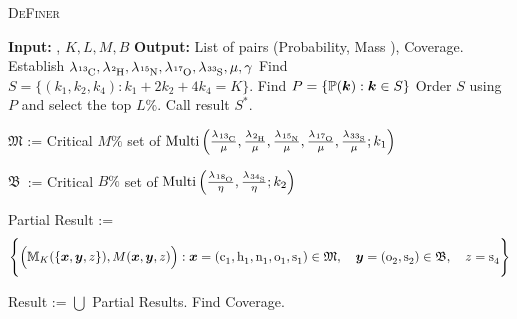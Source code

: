 \begin{algorithm}\caption{\textsc{DeFiner}}
\begin{algorithmic}\label{DeFine Parallely}
	\State	\textbf{Input:} \molecule, $K, L, M, B$
	\State 	\textbf{Output:} List of pairs (Probability, Mass ), Coverage.
	\State 	Establish $\lambda_\cem{^{13}C}, \lambda_\cem{^{2} H}, \lambda_\cem{^{15}N}, \lambda_\cem{^{17}O}, \lambda_\cem{^{33}S}, \mu, \gamma $
	\State 	Find  		$S = \{ (k_1, k_2, k_4) : k_1 + 2 k_2 + 4 k_4 = K \}$.
	\State 	Find 		$P = \{ \mathbb{P}(\bm{k}) : \bm{k} \in S \}$
	\State 	Order $S$ using $P$ and select the top $L \%$. Call result $S^*$.
	

		\State $\mathfrak{M}$ := Critical $M\%$ set of $\mathrm{Multi} \left(
				\frac{ \lambda_\cem{^{13}C} }{ \mu }, 
				\frac{ \lambda_\cem{^{2} H} }{ \mu }, 
				\frac{ \lambda_\cem{^{15}N} }{ \mu },
				\frac{ \lambda_\cem{^{17}O} }{ \mu }, 
				\frac{ \lambda_\cem{^{33}S} }{ \mu }; 
				k_1
			\right )$

		\State $\mathfrak{B}$ \,:= Critical $B\%$ set of 
		$\mathrm{Multi} \left(
			\frac{ \lambda_\cem{^{18}O} }{ \eta },
			\frac{ \lambda_\cem{^{34}S} }{ \eta }; 
			k_2	
		\right)$		


		\State 	Partial Result := {\small
		\begin{equation*}
				\Bigg\{ 
						\Big( 
							\MK ( \{\bm{x}, \bm{y}, z \}), 
							M( \bm{x}, \bm{y}, z )
						\Big) : \bm{x} = (\cem{c_1}, \cem{h_1}, \cem{n_1}, \cem{o_1}, \cem{s_1} ) \in \mathfrak{M},\quad \bm{y} = (\cem{o_2}, \cem{s_2}) \in \mathfrak{B},\quad z = \cem{s_4}  \Bigg\}			
		\end{equation*}}
	\ENDFORALL

	\State 	Result := $\bigcup $ Partial Results.
	\State 	Find {\sc Coverage}.
\end{algorithmic}	
\end{algorithm}